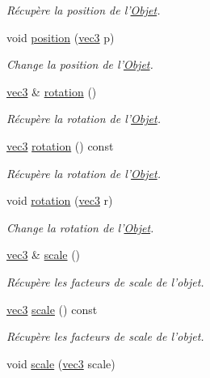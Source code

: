 \begin{DoxyCompactItemize}
\begin{DoxyCompactList}\small\item\em Récupère la position de l'\hyperlink{class_objet}{Objet}. \end{DoxyCompactList}\item 
void \hyperlink{class_objet_a89ed090c598f087792ee81c40ff46f75}{position} (\hyperlink{structvec3}{vec3} p)
\begin{DoxyCompactList}\small\item\em Change la position de l'\hyperlink{class_objet}{Objet}. \end{DoxyCompactList}\item 
\hyperlink{structvec3}{vec3} \& \hyperlink{class_objet_ac69a1b459bcb4433099c8cfbff06b209}{rotation} ()
\begin{DoxyCompactList}\small\item\em Récupère la rotation de l'\hyperlink{class_objet}{Objet}. \end{DoxyCompactList}\item 
\hyperlink{structvec3}{vec3} \hyperlink{class_objet_a0325e52c600e8de17312287b4f7a3e67}{rotation} () const 
\begin{DoxyCompactList}\small\item\em Récupère la rotation de l'\hyperlink{class_objet}{Objet}. \end{DoxyCompactList}\item 
void \hyperlink{class_objet_a2d37f15368f40615a8bc58622623d991}{rotation} (\hyperlink{structvec3}{vec3} r)
\begin{DoxyCompactList}\small\item\em Change la rotation de l'\hyperlink{class_objet}{Objet}. \end{DoxyCompactList}\item 
\hyperlink{structvec3}{vec3} \& \hyperlink{class_objet_ae09962e65216c36b31ab389a5af310a3}{scale} ()
\begin{DoxyCompactList}\small\item\em Récupère les facteurs de scale de l'objet. \end{DoxyCompactList}\item 
\hyperlink{structvec3}{vec3} \hyperlink{class_objet_a7e472f9f9362ecfa46e85bffcfc14e31}{scale} () const 
\begin{DoxyCompactList}\small\item\em Récupère les facteurs de scale de l'objet. \end{DoxyCompactList}\item 
void \hyperlink{class_objet_ae4ca090d86e327ad4654a068afcf3141}{scale} (\hyperlink{structvec3}{vec3} scale)

\end{DoxyCompactItemize}
